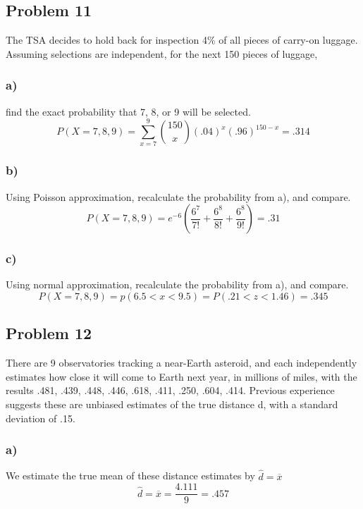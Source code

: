 \documentclass{article}
\begin{document}
\subsection*{Problem 11}
The TSA decides to hold back for inspection 4\% of all pieces of carry-on luggage. Assuming selections are independent, for the next 150 pieces of luggage, 
\subsubsection*{a)}
find the exact probability that 7, 8, or 9 will be selected.
\begin{equation}
    P(X = 7,8,9) = \sum_{x=7}^9 {150\choose{x}}(.04)^x(.96)^{150-x} = .314
\end{equation}
\subsubsection*{b)}
Using Poisson approximation, recalculate the probability from a), and compare.
\begin{equation}
    P(X = 7,8,9) = e^{-6}\left(\frac{6^7}{7!}+\frac{6^8}{8!}+\frac{6^8}{9!}\right) = .31
\end{equation}
\subsubsection*{c)}
Using normal approximation, recalculate the probability from a), and compare.
\begin{equation}
    P(X = 7,8,9) = p(6.5 < x < 9.5) = P(.21 < z < 1.46)  = .345
\end{equation}
\subsection*{Problem 12}
There are 9 observatories tracking a near-Earth asteroid, and each independently estimates how close it will come to Earth next year, in millions of miles, with the results .481, .439, .448, .446, .618, .411, .250, .604, .414. Previous experience suggests these are unbiased estimates of the true distance d, with a standard deviation of .15.
\subsubsection*{a)}
We estimate the true mean of these distance estimates by $\hat{d} = \overline{x}$
\begin{equation}
    \hat{d} = \overline{x} = \frac{4.111}{9} = .457
\end{equation}
\end{document}
